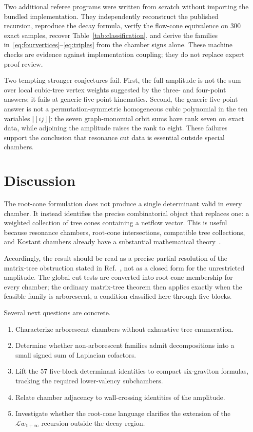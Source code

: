 \documentclass[11pt]{article}
\theoremstyle{definition}
\theoremstyle{remark}
\newcommand{\abs}[1]{\lvert #1\rvert}
\begin{document}
Two additional referee programs were written from scratch without importing
the bundled implementation.  They independently reconstruct the published
recursion, reproduce the decay formula, verify the flow-cone equivalence on
300 exact samples, recover Table~\ref{tab:classification}, and derive the
families in~\eqref{eq:fourvertices}--\eqref{eq:triples} from the chamber signs
alone.  These machine checks are evidence against implementation coupling;
they do not replace expert proof review.

Two tempting stronger conjectures fail.  First, the full amplitude is not the
sum over local cubic-tree vertex weights suggested by the three- and four-point
answers; it fails at generic five-point kinematics.  Second, the generic
five-point answer is not a permutation-symmetric homogeneous cubic polynomial
in the ten variables $\abs{[ij]}$: the seven graph-monomial orbit sums have
rank seven on exact data, while adjoining the amplitude raises the rank to
eight.  These failures support the conclusion that resonance cut data is
essential outside special chambers.

\section{Discussion}

The root-cone formulation does not produce a single determinant valid in every
chamber.  It instead identifies the precise combinatorial object that replaces
one: a weighted collection of tree cones containing a netflow vector.  This is
useful because resonance chambers, root-cone intersections, compatible tree
collections, and Kostant chambers already have a substantial mathematical
theory~\cite{RootCones}.

Accordingly, the result should be read as a precise partial resolution of the
matrix-tree obstruction stated in Ref.~\cite{GuevaraGraviton}, not as a closed
form for the unrestricted amplitude.  The global cut tests are converted into
root-cone membership for every chamber; the ordinary matrix-tree theorem then
applies exactly when the feasible family is arborescent, a condition classified
here through five blocks.

Several next questions are concrete.

\begin{enumerate}[leftmargin=2em]
  \item Characterize arborescent chambers without exhaustive tree enumeration.
  \item Determine whether non-arborescent families admit decompositions into a
        small signed sum of Laplacian cofactors.
  \item Lift the 57 five-block determinant identities to compact six-graviton
        formulas, tracking the required lower-valency subchambers.
  \item Relate chamber adjacency to wall-crossing identities of the amplitude.
  \item Investigate whether the root-cone language clarifies the extension of
        the $\mathcal Lw_{1+\infty}$ recursion outside the decay region.
\end{enumerate}
\end{document}
